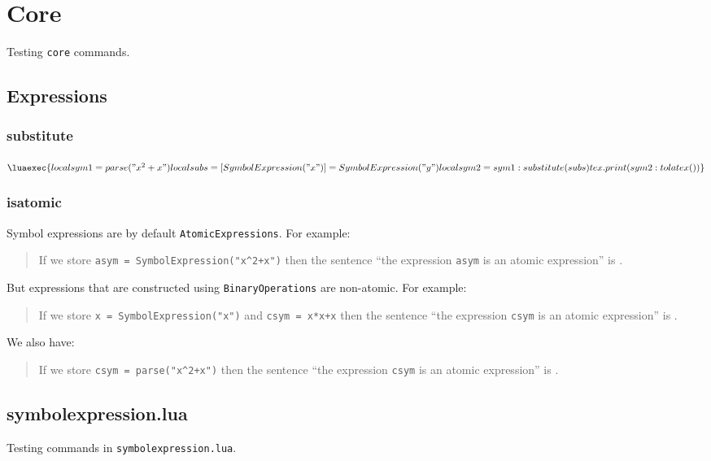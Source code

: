 \documentclass{article}
\begin{document}
\section{Core}
Testing \verb|core| commands. 

\subsection{Expressions}

\subsubsection{substitute}

$\luaexec{
    local sym1 = parse("x^2+x")
    local subs ={[SymbolExpression("x")]=SymbolExpression("y")}
    local sym2 = sym1:substitute(subs)
    tex.print(sym2:tolatex())
}$

    
\subsubsection{isatomic} 
Symbol expressions are by default \verb|AtomicExpressions|. For example: 
\begin{quote} 
If we store \verb|asym = SymbolExpression("x^2+x")| then the sentence ``the expression \verb|asym| is an atomic expression'' is 
.
\end{quote}
But expressions that are constructed using \verb|BinaryOperations| are non-atomic. For example:
\begin{quote}
    If we store \verb|x = SymbolExpression("x")| and \verb|csym = x*x+x| then the sentence ``the expression \verb|csym| is an atomic expression'' is
    .
\end{quote}
We also have:
\begin{quote}
    If we store \verb|csym = parse("x^2+x")| then the sentence ``the expression \verb|csym| is an atomic expression'' is
    .
\end{quote}



\subsection{symbolexpression.lua} 
Testing commands in \verb|symbolexpression.lua|. 
\end{document}
